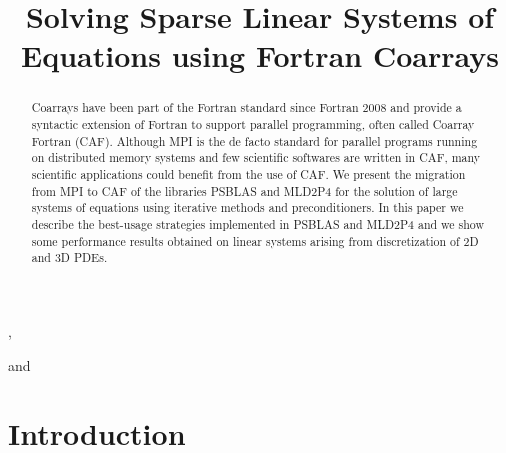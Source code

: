 \documentclass{IOS-Book-Article}
\def\hb{\hbox to 10.7 cm{}}
\begin{document}
\pagestyle{headings}
\def\thepage{}

\begin{frontmatter}              %


\title{Solving Sparse Linear Systems of Equations using Fortran Coarrays}


\author[A]{ %
},
\author[A]{ }
and
\author[B]{ }

\address[A]{University of Rome Tor Vergata}
\address[B]{Cranfield University}

\begin{abstract}
Coarrays have been part of the Fortran standard since
Fortran 2008 and provide a syntactic extension of Fortran to
support parallel programming, often called Coarray Fortran (CAF). 
Although MPI is the de facto standard for parallel programs running on
distributed memory systems and few scientific softwares are written in
CAF, many scientific applications could benefit from the use of CAF.  
We present the migration from MPI to CAF of the libraries PSBLAS  and
MLD2P4 for the solution of large systems of equations using iterative
methods and preconditioners.  
In this paper we describe the best-usage strategies implemented in
PSBLAS and MLD2P4 and we show some performance results obtained on
linear systems arising from discretization of 2D and 3D PDEs.   
\end{abstract}

\begin{keyword}
\end{keyword}
\end{frontmatter}



\section{Introduction}
\end{document}
